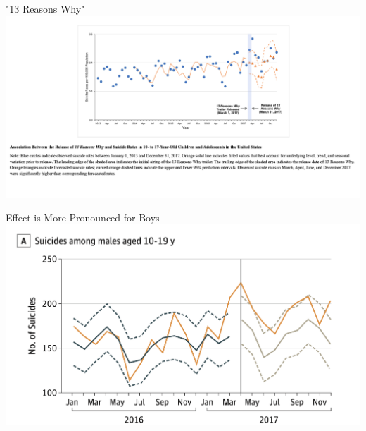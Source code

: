 \documentclass[nobackground,dvipsnames,table]{beamer}
\begin{document}
\begin{frame}{"13 Reasons Why"}
    \includegraphics[width=\textwidth]{13-reasons-why-impact-on-adolescent-suicides}
\end{frame}

\begin{frame}{Effect is More Pronounced for Boys}
    \includegraphics[width=\textwidth]{13-reasons-why-stronger-impact-on-boys}
\end{frame}
\end{document}

